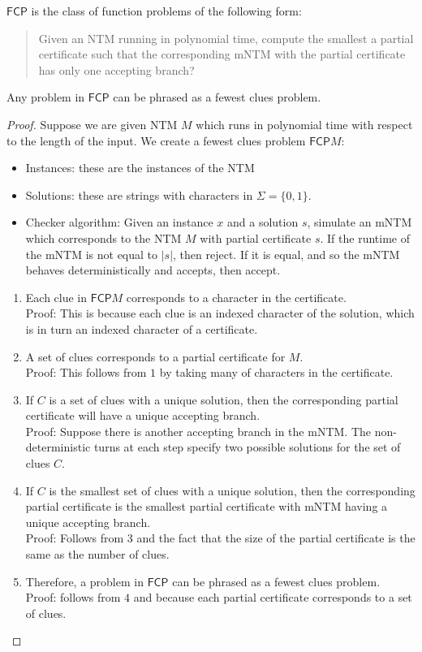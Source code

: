 \documentclass[runningheads,a4paper]{llncs}
\begin{document}
\begin{definition}
$\mathsf{FCP}$ is the class of function problems of the following form:
\begin{quote}
Given an NTM running in polynomial time, compute the smallest a partial certificate such that the corresponding mNTM with the partial certificate has only one accepting branch?
\end{quote}
\end{definition}

\begin{proposition}
Any problem in $\mathsf{FCP}$ can be phrased as a fewest clues problem.
\end{proposition}

\begin{proof}
Suppose we are given NTM $M$ which runs in polynomial time with respect to the length of the input. We create a fewest clues problem $\mathsf{FCP} M$:
\begin{itemize}
\item Instances: these are the instances of the NTM
\item Solutions: these are strings with characters in $\Sigma = \{ 0, 1 \}$.
\item Checker algorithm: Given an instance $x$ and a solution $s$, simulate an mNTM which corresponds to the NTM $M$ with partial certificate $s$. If the runtime of the mNTM is not equal to $|s|$, then reject. If it is equal, and so the mNTM behaves deterministically and accepts, then accept. 
\end{itemize}
\begin{enumerate}
\item Each clue in $\mathsf{FCP} M$ corresponds to a character in the certificate.\\
Proof: This is because each clue is an indexed character of the solution, which is in turn an indexed character of a certificate.
\item A set of clues corresponds to a partial certificate for $M$.\\
Proof: This follows from $1$ by taking many of characters in the certificate.
\item If $C$ is a set of clues with a unique solution, then the corresponding partial certificate will have a unique accepting branch.\\
Proof: Suppose there is another accepting branch in the mNTM. The non-deterministic turns at each step specify two possible solutions for the set of clues $C$. 
\item If $C$ is the smallest set of clues with a unique solution, then the corresponding partial certificate is the smallest partial certificate with mNTM having a unique accepting branch.\\
Proof: Follows from 3 and the fact that the size of the partial certificate is the same as the number of clues.
\item Therefore, a problem in $\mathsf{FCP}$ can be phrased as a fewest clues problem.\\
Proof: follows from $4$ and because each partial certificate corresponds to a set of clues.
\end{enumerate}
\end{proof}
\end{document}

